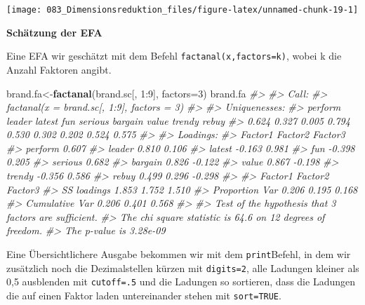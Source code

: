 \documentclass[12pt,]{book}
\newenvironment{Shaded}{\begin{snugshade}}{\end{snugshade}}
\newcommand{\KeywordTok}[1]{\textcolor[rgb]{0.13,0.29,0.53}{\textbf{{#1}}}}
\newcommand{\DataTypeTok}[1]{\textcolor[rgb]{0.13,0.29,0.53}{{#1}}}
\newcommand{\DecValTok}[1]{\textcolor[rgb]{0.00,0.00,0.81}{{#1}}}
\newcommand{\CommentTok}[1]{\textcolor[rgb]{0.56,0.35,0.01}{\textit{{#1}}}}
\newcommand{\NormalTok}[1]{{#1}}
\begin{document}
\begin{center}\texttt{[image: 083\_Dimensionsreduktion\_files/figure-latex/unnamed-chunk-19-1]} \end{center}

\textbf{Schätzung der EFA}

Eine EFA wir geschätzt mit dem Befehl \texttt{factanal(x,factors=k)},
wobei k die Anzahl Faktoren angibt.

\begin{Shaded}
\begin{Highlighting}[]
\NormalTok{brand.fa<-}\KeywordTok{factanal}\NormalTok{(brand.sc[, }\DecValTok{1}\NormalTok{:}\DecValTok{9}\NormalTok{], }\DataTypeTok{factors=}\DecValTok{3}\NormalTok{)}
\NormalTok{brand.fa}
\CommentTok{#> }
\CommentTok{#> Call:}
\CommentTok{#> factanal(x = brand.sc[, 1:9], factors = 3)}
\CommentTok{#> }
\CommentTok{#> Uniquenesses:}
\CommentTok{#> perform  leader  latest     fun serious bargain   value  trendy   rebuy }
\CommentTok{#>   0.624   0.327   0.005   0.794   0.530   0.302   0.202   0.524   0.575 }
\CommentTok{#> }
\CommentTok{#> Loadings:}
\CommentTok{#>         Factor1 Factor2 Factor3}
\CommentTok{#> perform          0.607         }
\CommentTok{#> leader           0.810   0.106 }
\CommentTok{#> latest  -0.163           0.981 }
\CommentTok{#> fun             -0.398   0.205 }
\CommentTok{#> serious          0.682         }
\CommentTok{#> bargain  0.826          -0.122 }
\CommentTok{#> value    0.867          -0.198 }
\CommentTok{#> trendy  -0.356           0.586 }
\CommentTok{#> rebuy    0.499   0.296  -0.298 }
\CommentTok{#> }
\CommentTok{#>                Factor1 Factor2 Factor3}
\CommentTok{#> SS loadings      1.853   1.752   1.510}
\CommentTok{#> Proportion Var   0.206   0.195   0.168}
\CommentTok{#> Cumulative Var   0.206   0.401   0.568}
\CommentTok{#> }
\CommentTok{#> Test of the hypothesis that 3 factors are sufficient.}
\CommentTok{#> The chi square statistic is 64.6 on 12 degrees of freedom.}
\CommentTok{#> The p-value is 3.28e-09}
\end{Highlighting}
\end{Shaded}

Eine Übersichtlichere Ausgabe bekommen wir mit dem \texttt{print}Befehl,
in dem wir zusätzlich noch die Dezimalstellen kürzen mit
\texttt{digits=2}, alle Ladungen kleiner als 0,5 ausblenden mit
\texttt{cutoff=.5} und die Ladungen so sortieren, dass die Ladungen die
auf einen Faktor laden untereinander stehen mit \texttt{sort=TRUE}.
\end{document}
